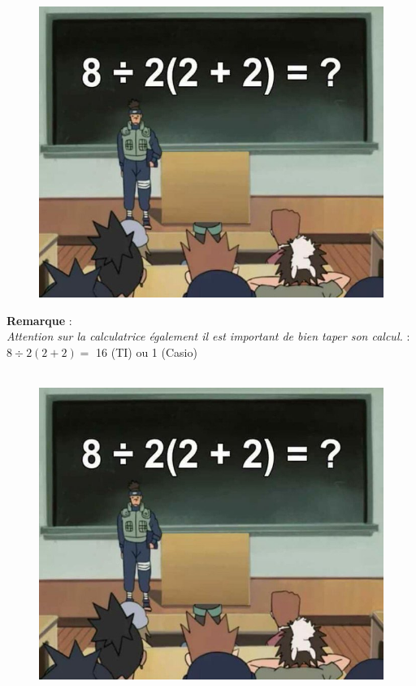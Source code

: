 \documentclass[11pt]{article}
\begin{document}
\begin{figure}[H]
      \centering
      \includegraphics[width=0.4\linewidth]{5x1-calculer/naruto.png}
\end{figure}




\textbf{Remarque} : \\
\textit{Attention sur la calculatrice également il est important de bien taper son calcul. } : $8 \div 2(2+2) =$ 16 (TI) ou 1 (Casio)

\begin{figure}[H]
      \centering
      \includegraphics[width=0.4\linewidth]{5x1-calculer/naruto.png}
\end{figure}
\end{document}
